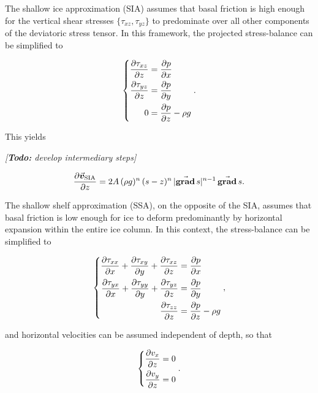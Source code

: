 \documentclass{article}
\newcommand{\todo}[1]{\emph{[\textbf{Todo:} #1]}}
\newcommand{\vect}[1]{\va*{#1}} %
\renewcommand{\grad}[1]{\vect{\mathrm{grad}}\,#1}   %
\newcommand{\vv}[0]{\vect{v}}           %
\newcommand{\vsia}[0]{\vv_{\mathrm{SIA}}}   %
\begin{document}
The shallow ice approximation (SIA) assumes that basal friction is high enough
for the vertical shear stresses $\{\tau_{xz}, \tau_{yz}\}$ to predominate over
all other components of the deviatoric stress tensor. In this framework, the
projected stress-balance can be simplified to

\begin{equation}
    \left\{\begin{aligned}
        \pdv{\tau_{xz}}{z} &= \pdv{p}{x} \\
        \pdv{\tau_{yz}}{z} &= \pdv{p}{y} \\
        0 &= \pdv{p}{z} - \rho g
    \end{aligned}\right..
\end{equation}

This yields

\todo{develop intermediary steps}

\begin{equation}
    \pdv{\vsia}{z} = 2A\,(\rho g)^n\,(s-z)^n\,|\grad{s}|^{n-1}\,\grad{s}.
\end{equation}

The shallow shelf approximation (SSA), on the opposite of the SIA, assumes that
basal friction is low enough for ice to deform predominantly by horizontal
expansion within the entire ice column. In this context, the stress-balance can
be simplified to

\begin{equation}
    \left\{\begin{aligned}
        \pdv{\tau_{xx}}{x} + \pdv{\tau_{xy}}{y} + \pdv{\tau_{xz}}{z}
            &= \pdv{p}{x} \\
        \pdv{\tau_{yx}}{x} + \pdv{\tau_{yy}}{y} + \pdv{\tau_{yz}}{z}
            &= \pdv{p}{y} \\
        \pdv{\tau_{zz}}{z} &= \pdv{p}{z} - \rho g
    \end{aligned}\right.,
\end{equation}

and horizontal velocities can be assumed independent of depth, so that

\begin{equation}
    \left\{\begin{aligned}
        \pdv{v_x}{z} &= 0 \\
        \pdv{v_y}{z} &= 0 \\
    \end{aligned}\right..
\end{equation}
\end{document}
